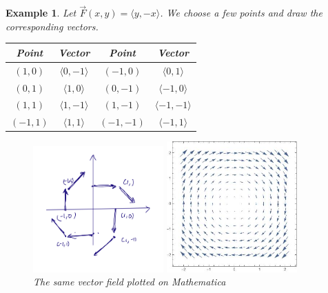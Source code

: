 \documentclass[12pt]{article}
\newcommand{\vF}{\vec{F}}
\renewcommand{\lg}{\langle}
\newcommand{\rg}{\rangle}
\newtheorem{example}{Example}
\begin{document}
\begin{example}
Let $\vF(x,y)=\lg y,-x\rg$. We choose a few points and draw the corresponding vectors.
\begin{center}\begin{tabular}{|c|c|c|c|}
\hline 
Point & Vector & Point & Vector \\ 
\hline 
$(1,0)$ & $\lg 0, -1\rg$ & $(-1,0) $& $\lg 0,1\rg $\\	 
\hline 
$ (0,1)$& $\lg 1,0\rg $& $(0,-1)$ &  $\lg -1,0\rg $\\ 
\hline 
$(1,1)$& $\lg1,-1\rg$ & $(1,-1)$ & $\lg -1,-1\rg$ \\ 
\hline 
$(-1,1)$& $\lg 1,1\rg$ & $(-1,-1)$ & $\lg -1,1\rg$  \\ 
\hline 
\end{tabular} \end{center}


\begin{figure}[h]
\centering
\parbox{5cm}{
\includegraphics[width=5cm]{vf1.jpeg}
\caption{The vector field of the example}
\label{}}
\qquad
\begin{minipage}{5cm}
\includegraphics[width=5cm]{vf2.jpeg}
\caption{The same vector field plotted on Mathematica}
\label{fig:2figsB}
\end{minipage}
\end{figure}




\end{example}
\end{document}
